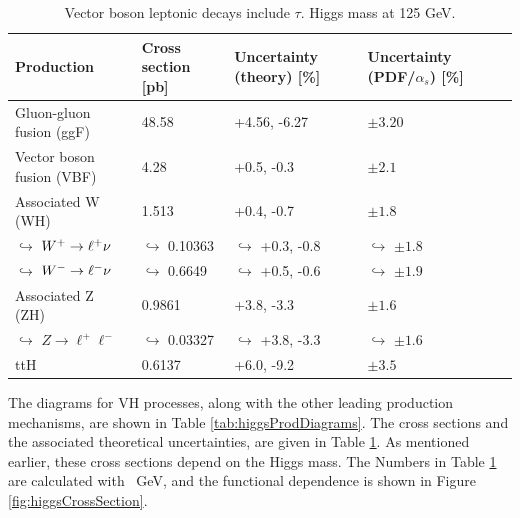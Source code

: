 \begin{table}[htp]
\begin{center}
{\footnotesize
\begin{tabular}{l | l | l l l}
\toprule
Production & Cross section [pb] & Uncertainty (theory) [\%] & Uncertainty (PDF/$\alpha_s$) [\%] \\
\midrule
Gluon-gluon fusion (ggF)  & 48.58       & +4.56, -6.27 & $\pm3.20$  \\
Vector boson fusion (VBF) &  4.28       & +0.5, -0.3 & $\pm2.1$  \\
Associated W (WH)         & 1.513       & +0.4, -0.7 & $\pm1.8$  \\
$\hookrightarrow$  $W^+\to\ell^+\nu$    &$\hookrightarrow$ 0.10363 &$\hookrightarrow$ +0.3, -0.8 &$\hookrightarrow$ $\pm1.8$  \\
$\hookrightarrow$  $W^-\to\ell^-\nu$    &$\hookrightarrow$ 0.6649  &$\hookrightarrow$ +0.5, -0.6 &$\hookrightarrow$ $\pm1.9$  \\
Associated Z (ZH)         & 0.9861      & +3.8, -3.3 & $\pm1.6$  \\
$\hookrightarrow$  $Z\to\ell^+\ell^-$   &$\hookrightarrow$ 0.03327 &$\hookrightarrow$ +3.8, -3.3 &$\hookrightarrow$ $\pm1.6$  \\
ttH                       &  0.6137     & +6.0, -9.2 & $\pm3.5$  \\
\bottomrule
\end{tabular}
}
\caption{Vector boson leptonic decays include $\tau$. Higgs mass at 125 GeV.\cite{higgsCross}}
\label{tab:higgsCrossSec}
\end{center}
\end{table}

The diagrams for VH processes, along with the other leading production mechanisms, are shown in Table \ref{tab:higgsProdDiagrams}.
The cross sections and the associated theoretical uncertainties, are given in Table \ref{tab:higgsCrossSec}.
As mentioned earlier, these cross sections depend on the Higgs mass. The Numbers in Table \ref{tab:higgsCrossSec} are calculated with ~GeV, and the functional dependence is shown in Figure \ref{fig:higgsCrossSection}.

